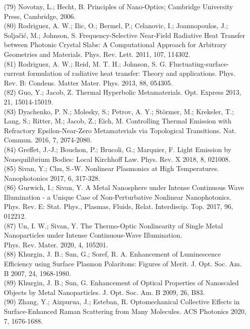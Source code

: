 \documentclass[10pt]{article}
\begin{document}
(79) Novotny, L.; Hecht, B. Principles of Nano-Optics; Cambridge University Press, Cambridge, 2006.\\
(80) Rodriguez, A. W.; Ilic, O.; Bermel, P.; Celanovic, I.; Joannopoulos, J.; Soljačić, M.; Johnson, S. Frequency-Selective Near-Field Radiative Heat Transfer between Photonic Crystal Slabs: A Computational Approach for Arbitrary Geometries and Materials. Phys. Rev. Lett. 2011, 107, 114302.\\
(81) Rodriguez, A. W.; Reid, M. T. H.; Johnson, S. G. Fluctuating-surface-current formulation of radiative heat transfer: Theory and applications. Phys. Rev. B: Condens. Matter Mater. Phys. 2013, 88, 054305.\\
(82) Guo, Y.; Jacob, Z. Thermal Hyperbolic Metamaterials. Opt. Express 2013, 21, 15014-15019.\\
(83) Dyachenko, P. N.; Molesky, S.; Petrov, A. Y.; Störmer, M.; Krekeler, T.; Lang, S.; Ritter, M.; Jacob, Z.; Eich, M. Controlling Thermal Emission with Refractory Epsilon-Near-Zero Metamaterials via Topological Transitions. Nat. Commun. 2016, 7, 2074-2080.\\
(84) Greffet, J.-J.; Bouchon, P.; Brucoli, G.; Marquier, F. Light Emission by Nonequilibrium Bodies: Local Kirchhoff Law. Phys. Rev. X 2018, 8, 021008.\\
(85) Sivan, Y.; Chu, S.-W. Nonlinear Plasmonics at High Temperatures. Nanophotonics 2017, 6, 317-328.\\
(86) Gurwich, I.; Sivan, Y. A Metal Nanosphere under Intense Continuous Wave Illumination - a Unique Case of Non-Perturbative Nonlinear Nanophotonics. Phys. Rev. E: Stat. Phys., Plasmas, Fluids, Relat. Interdiscip. Top. 2017, 96, 012212.\\
(87) Un, I. W.; Sivan, Y. The Thermo-Optic Nonlinearity of Single Metal Nanoparticles under Intense Continuous-Wave Illumination.\\
Phys. Rev. Mater. 2020, 4, 105201.\\
(88) Khurgin, J. B.; Sun, G.; Soref, R. A. Enhancement of Luminescence Efficiency using Surface Plasmon Polaritons: Figures of Merit. J. Opt. Soc. Am. B 2007, 24, 1968-1980.\\
(89) Khurgin, J. B.; Sun, G. Enhancement of Optical Properties of Nanoscaled Objects by Metal Nanoparticles. J. Opt. Soc. Am. B 2009, 26, B83.\\
(90) Zhang, Y.; Aizpurua, J.; Esteban, R. Optomechanical Collective Effects in Surface-Enhanced Raman Scattering from Many Molecules. ACS Photonics 2020, 7, 1676-1688.\\
\end{document}
